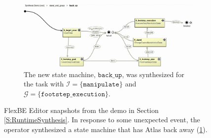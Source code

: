 \begin{figure}[t]
	\vspace{4 pt}
	\begin{subfigure}[b]{0.99\columnwidth}
	\includegraphics[width=0.99\columnwidth, clip]{./img/synthesis_runtime_synthesized_sm.png}
	\caption{The new state machine, $\mathtt{back\_up}$, was synthesized for the task with $\mathcal{I} = \{ \mathtt{manipulate} \}$ and $\mathcal{G} = \{ \mathtt{footstep\_execution} \}$.
	} 
	\label{Fig:runtime2}
	\end{subfigure}
	\caption{
	FlexBE Editor snapshots from the demo in Section \ref{S:RuntimeSynthesis}.
	In response to some unexpected event, the operator synthesized a state machine that has Atlas back away (\ref{Fig:runtime2}).
	}
	\label{Fig:synthesis_runtime_demo}
\end{figure}

%

